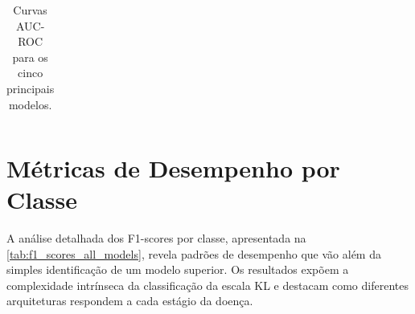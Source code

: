 \begin{table}[!htbp]
\begin{tabular}{|c|c|c|}
    \end{tabular}
    \caption{Curvas AUC-ROC para os cinco principais modelos.}
    \label{tab:curvas_auc_roc}
\end{table}

\section{Métricas de Desempenho por Classe}

A análise detalhada dos F1-scores por classe, apresentada na \autoref{tab:f1_scores_all_models}, revela padrões de desempenho que vão além da simples identificação de um modelo superior. Os resultados expõem a complexidade intrínseca da classificação da escala KL e destacam como diferentes arquiteturas respondem a cada estágio da doença.

